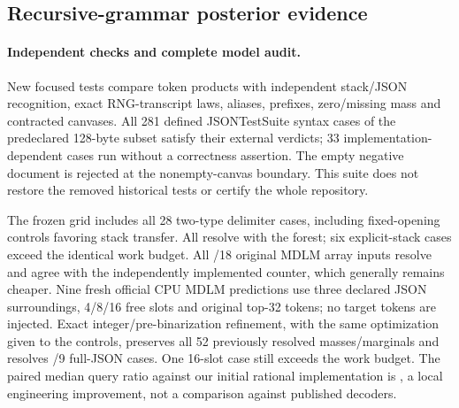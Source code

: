 \subsection{Recursive-grammar posterior evidence}


\paragraph{Independent checks and complete model audit.}
New focused tests compare token products with independent stack/JSON recognition,
exact RNG-transcript laws, aliases, prefixes, zero/missing mass and contracted
canvases. All 281 defined JSONTestSuite syntax cases of the predeclared
128-byte subset satisfy their external verdicts; 33 implementation-dependent
cases run without a correctness assertion. The empty negative document is
rejected at the nonempty-canvas boundary. This suite does not restore the
removed historical tests or certify the whole repository.

The frozen grid includes all 28 two-type delimiter cases, including fixed-opening
controls favoring stack transfer. All resolve with the forest; six explicit-stack
cases exceed the identical work budget. All \MCfgReplayExact{}/18 original MDLM
array inputs resolve and agree with the independently implemented counter,
which generally remains cheaper. Nine fresh official CPU MDLM predictions use
three declared JSON surroundings, 4/8/16 free slots and original top-32 tokens;
no target tokens are injected. Exact integer/pre-binarization refinement,
with the same optimization given to the controls, preserves all 52 previously
resolved masses/marginals and resolves \MCfgFreshExact{}/9 full-JSON cases.
One 16-slot case still exceeds the work budget. The paired median query ratio
against our initial rational implementation is \MCfgRefinementSpeed{}, a local
engineering improvement, not a comparison against published decoders.

\begin{table}[htbp]
\centering\small

\caption{All nine new JSON canvases. C0/C1/C2 identify the declared parameter,
items and message surroundings; the suffix is free token slots. First sample
includes construction, evaluation and sampling; reuse commits half the free
positions. $^{*}$Expected rejection trials are algebraic $Q/Z_S$, where
$Q=\prod_i\sum_{t\in S_i}q_i(t)$, not measured wall-time speedups.}
\label{tab:cfg-posterior}
\end{table}

